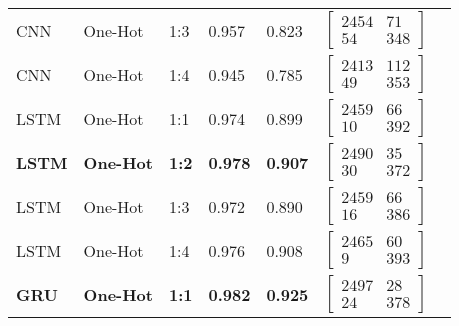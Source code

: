 \begin{table}[ht]
\begin{tabular}{lllllll}
        CNN & One-Hot & 1:3 & 0.957 & 0.823 & 
    	$\begin{bmatrix}
            2454 & 71\\ 
            54 & 348
        \end{bmatrix}$
        \\
        
        CNN & One-Hot & 1:4 & 0.945 & 0.785 & 
    	$\begin{bmatrix}
            2413 & 112\\ 
            49 & 353
        \end{bmatrix}$
        \\\midrule
        
        LSTM & One-Hot & 1:1 & 0.974 & 0.899 & 
    	$\begin{bmatrix}
            2459 & 66\\ 
            10 & 392
        \end{bmatrix}$
        \\
        
        \textbf{LSTM} & \textbf{One-Hot} & \textbf{1:2} & \textbf{0.978} & \textbf{0.907} & 
    	$\begin{bmatrix}
            2490 & 35\\ 
            30 & 372
        \end{bmatrix}$
        \\
        
        LSTM & One-Hot & 1:3 & 0.972 & 0.890 & 
    	$\begin{bmatrix}
            2459 & 66\\ 
            16 & 386
        \end{bmatrix}$
        \\
        
        LSTM & One-Hot & 1:4 & 0.976 & 0.908 & 
    	$\begin{bmatrix}
            2465 & 60\\ 
            9 & 393
        \end{bmatrix}$
        \\\midrule
        
        \textbf{GRU} & \textbf{One-Hot} & \textbf{1:1} & \textbf{0.982} & \textbf{0.925} & 
    	$\begin{bmatrix}
            2497 & 28\\ 
            24 & 378
        \end{bmatrix}$
        \\
        

\end{tabular}
\end{table}
